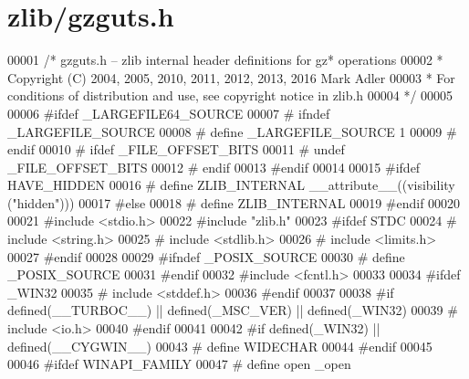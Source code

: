 \hypertarget{zlib_2gzguts_8h_source}{}\section{zlib/gzguts.h}
\label{zlib_2gzguts_8h_source}

\begin{DoxyCode}
00001 \textcolor{comment}{/* gzguts.h -- zlib internal header definitions for gz* operations}
00002 \textcolor{comment}{ * Copyright (C) 2004, 2005, 2010, 2011, 2012, 2013, 2016 Mark Adler}
00003 \textcolor{comment}{ * For conditions of distribution and use, see copyright notice in zlib.h}
00004 \textcolor{comment}{ */}
00005 
00006 \textcolor{preprocessor}{#ifdef \_LARGEFILE64\_SOURCE}
00007 \textcolor{preprocessor}{#  ifndef \_LARGEFILE\_SOURCE}
00008 \textcolor{preprocessor}{#    define \_LARGEFILE\_SOURCE 1}
00009 \textcolor{preprocessor}{#  endif}
00010 \textcolor{preprocessor}{#  ifdef \_FILE\_OFFSET\_BITS}
00011 \textcolor{preprocessor}{#    undef \_FILE\_OFFSET\_BITS}
00012 \textcolor{preprocessor}{#  endif}
00013 \textcolor{preprocessor}{#endif}
00014 
00015 \textcolor{preprocessor}{#ifdef HAVE\_HIDDEN}
00016 \textcolor{preprocessor}{#  define ZLIB\_INTERNAL \_\_attribute\_\_((visibility ("hidden")))}
00017 \textcolor{preprocessor}{#else}
00018 \textcolor{preprocessor}{#  define ZLIB\_INTERNAL}
00019 \textcolor{preprocessor}{#endif}
00020 
00021 \textcolor{preprocessor}{#include <stdio.h>}
00022 \textcolor{preprocessor}{#include "zlib.h"}
00023 \textcolor{preprocessor}{#ifdef STDC}
00024 \textcolor{preprocessor}{#  include <string.h>}
00025 \textcolor{preprocessor}{#  include <stdlib.h>}
00026 \textcolor{preprocessor}{#  include <limits.h>}
00027 \textcolor{preprocessor}{#endif}
00028 
00029 \textcolor{preprocessor}{#ifndef \_POSIX\_SOURCE}
00030 \textcolor{preprocessor}{#  define \_POSIX\_SOURCE}
00031 \textcolor{preprocessor}{#endif}
00032 \textcolor{preprocessor}{#include <fcntl.h>}
00033 
00034 \textcolor{preprocessor}{#ifdef \_WIN32}
00035 \textcolor{preprocessor}{#  include <stddef.h>}
00036 \textcolor{preprocessor}{#endif}
00037 
00038 \textcolor{preprocessor}{#if defined(\_\_TURBOC\_\_) || defined(\_MSC\_VER) || defined(\_WIN32)}
00039 \textcolor{preprocessor}{#  include <io.h>}
00040 \textcolor{preprocessor}{#endif}
00041 
00042 \textcolor{preprocessor}{#if defined(\_WIN32) || defined(\_\_CYGWIN\_\_)}
00043 \textcolor{preprocessor}{#  define WIDECHAR}
00044 \textcolor{preprocessor}{#endif}
00045 
00046 \textcolor{preprocessor}{#ifdef WINAPI\_FAMILY}
00047 \textcolor{preprocessor}{#  define open \_open}

\end{DoxyCode}
